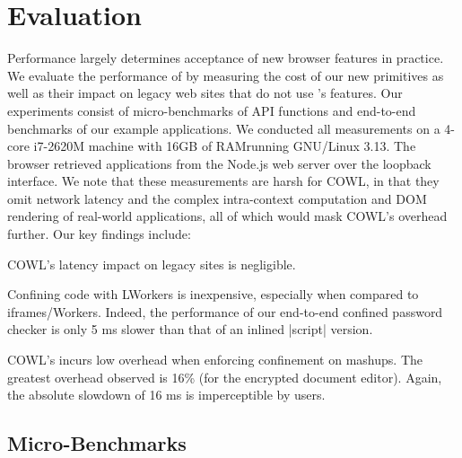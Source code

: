 \section{Evaluation}
\label{sec:eval}

Performance largely determines acceptance of new browser features
in practice.
%
We evaluate the performance of \sys{} by measuring the cost of our
new primitives as well as their impact on legacy web sites that do
not use \sys{}'s features.
%
Our experiments consist of micro-benchmarks of API functions and
end-to-end benchmarks of our example applications.
%
We conducted all measurements on a 4-core i7-2620M machine with 16GB
of RAM\@ running GNU/Linux 3.13. The browser retrieved applications
from the Node.js web server over the loopback interface.
%
We note that these measurements are harsh for COWL, in that they omit
network latency and the complex intra-context computation and DOM
rendering of real-world applications, all of which would mask COWL's
overhead further.
%
Our key findings include:
\begin{CompactItemize}
  \item COWL's latency impact on legacy sites is negligible.
  \item Confining code with LWorkers is inexpensive, especially
    when compared to iframes/Workers.
    Indeed, the performance of our end-to-end confined password
    checker is only 5 ms slower than that of an inlined \js|script| version.
  \item COWL's incurs low overhead when enforcing confinement on mashups.
    The greatest overhead observed is 16\% (for the encrypted document editor).
    Again, the absolute slowdown of 16 ms is imperceptible by users.
\end{CompactItemize}

\subsection{Micro-Benchmarks}
\label{sec:eval:micro}

\newcommand*\rot{\rotatebox{90}}

